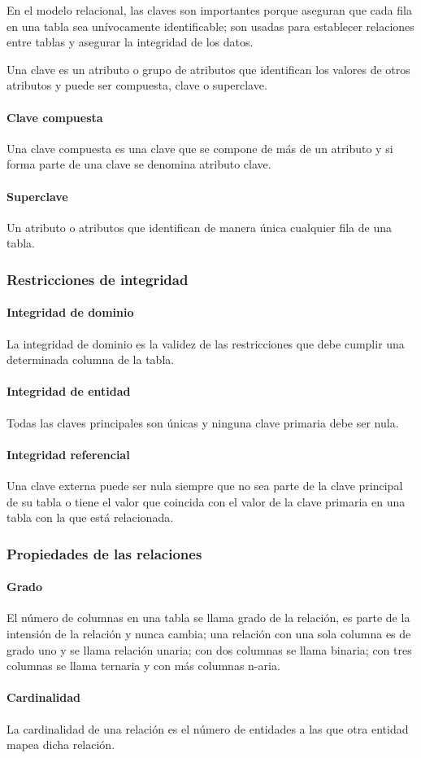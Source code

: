 En el modelo relacional, las claves son importantes porque aseguran que cada fila en una tabla sea unívocamente identificable; son usadas para establecer relaciones entre tablas y asegurar la integridad de los datos.

Una clave es un atributo o grupo de atributos que identifican los valores de otros atributos y puede ser compuesta, clave o superclave. 

\paragraph*{Clave compuesta}
Una clave compuesta es una clave que se compone de más de un atributo y si forma parte de una clave se denomina atributo clave.

\paragraph*{Superclave}
Un atributo o atributos que identifican de manera única cualquier fila de una tabla.

\subsubsection{Restricciones de integridad}
\paragraph*{Integridad de dominio}
La integridad de dominio es la validez de las restricciones que debe cumplir una determinada columna de la tabla.
\paragraph*{Integridad de entidad}
Todas las claves principales son únicas y ninguna clave primaria debe ser nula.
\paragraph*{Integridad referencial}
Una clave externa puede ser nula siempre que no sea parte de la clave principal de su tabla o tiene el valor que coincida con el valor de la clave primaria en una tabla con la que está relacionada.

\subsubsection{Propiedades de las relaciones}
\paragraph*{Grado}
El número de columnas en una tabla se llama grado de la relación, es parte de la intensión de la relación y nunca cambia; una relación con una sola columna es de grado uno y se llama relación unaria; con dos columnas se llama binaria; con tres columnas se llama ternaria y con más columnas n-aria.


\paragraph*{Cardinalidad}
La cardinalidad de una relación es el número de entidades a las que otra entidad mapea dicha relación.
